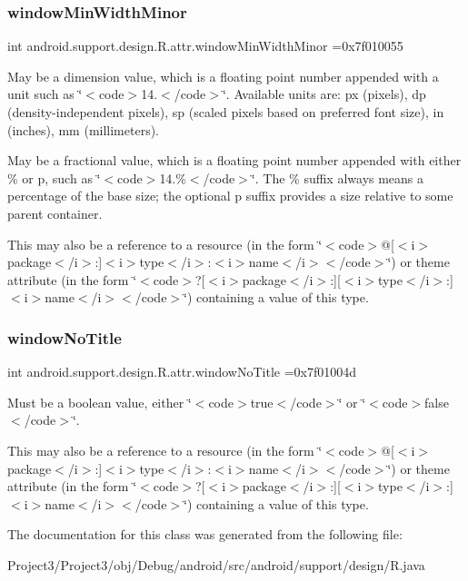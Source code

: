 \subsubsection{\texorpdfstring{window\+Min\+Width\+Minor}{windowMinWidthMinor}}
{\footnotesize\ttfamily int android.\+support.\+design.\+R.\+attr.\+window\+Min\+Width\+Minor =0x7f010055\hspace{0.3cm}{\ttfamily [static]}}

May be a dimension value, which is a floating point number appended with a unit such as \char`\"{}$<$code$>$14.\+5sp$<$/code$>$\char`\"{}. Available units are\+: px (pixels), dp (density-\/independent pixels), sp (scaled pixels based on preferred font size), in (inches), mm (millimeters). 

May be a fractional value, which is a floating point number appended with either \% or p, such as \char`\"{}$<$code$>$14.\%$<$/code$>$\char`\"{}. The \% suffix always means a percentage of the base size; the optional p suffix provides a size relative to some parent container. 

This may also be a reference to a resource (in the form \char`\"{}$<$code$>$@\mbox{[}$<$i$>$package$<$/i$>$\+:\mbox{]}$<$i$>$type$<$/i$>$\+:$<$i$>$name$<$/i$>$$<$/code$>$\char`\"{}) or theme attribute (in the form \char`\"{}$<$code$>$?\mbox{[}$<$i$>$package$<$/i$>$\+:\mbox{]}\mbox{[}$<$i$>$type$<$/i$>$\+:\mbox{]}$<$i$>$name$<$/i$>$$<$/code$>$\char`\"{}) containing a value of this type. \mbox{\label{classandroid_1_1support_1_1design_1_1R_1_1attr_a9dc70da163b81fffb9b6eb85e61ee72f}} 
\subsubsection{\texorpdfstring{window\+No\+Title}{windowNoTitle}}
{\footnotesize\ttfamily int android.\+support.\+design.\+R.\+attr.\+window\+No\+Title =0x7f01004d\hspace{0.3cm}{\ttfamily [static]}}

Must be a boolean value, either \char`\"{}$<$code$>$true$<$/code$>$\char`\"{} or \char`\"{}$<$code$>$false$<$/code$>$\char`\"{}. 

This may also be a reference to a resource (in the form \char`\"{}$<$code$>$@\mbox{[}$<$i$>$package$<$/i$>$\+:\mbox{]}$<$i$>$type$<$/i$>$\+:$<$i$>$name$<$/i$>$$<$/code$>$\char`\"{}) or theme attribute (in the form \char`\"{}$<$code$>$?\mbox{[}$<$i$>$package$<$/i$>$\+:\mbox{]}\mbox{[}$<$i$>$type$<$/i$>$\+:\mbox{]}$<$i$>$name$<$/i$>$$<$/code$>$\char`\"{}) containing a value of this type. 

The documentation for this class was generated from the following file\+:\begin{DoxyCompactItemize}
\item 
Project3/\+Project3/obj/\+Debug/android/src/android/support/design/R.\+java\end{DoxyCompactItemize}
